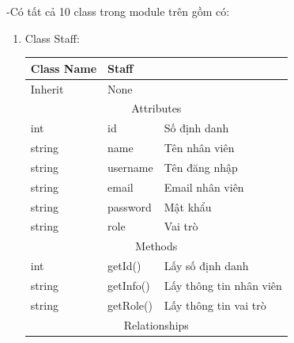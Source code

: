     \newpage
    -Có tất cả 10 class trong module trên gồm có:
    \begin{enumerate}
        \item Class Staff:

        \begin{table}[htp]
            \begin{tabular}{|lll|}
                \hline
                \multicolumn{1}{|l|}{Class Name} & \multicolumn{2}{l|}{Staff}                               \\ \hline
                \multicolumn{1}{|l|}{Inherit}    & \multicolumn{2}{l|}{None}                                \\ \hline
                \multicolumn{3}{|c|}{\cellcolor[HTML]{FFFFC7}Attributes}                                    \\ \hline
                \multicolumn{1}{|l|}{int}        & \multicolumn{1}{l|}{id}        & Số định danh            \\ \hline
                \multicolumn{1}{|l|}{string}     & \multicolumn{1}{l|}{name}      & Tên nhân viên           \\ \hline
                \multicolumn{1}{|l|}{string}     & \multicolumn{1}{l|}{username}  & Tên đăng nhập           \\ \hline
                \multicolumn{1}{|l|}{string}     & \multicolumn{1}{l|}{email}     & Email nhân viên         \\ \hline
                \multicolumn{1}{|l|}{string}     & \multicolumn{1}{l|}{password}  & Mật khẩu                \\ \hline
                \multicolumn{1}{|l|}{string}     & \multicolumn{1}{l|}{role}      & Vai trò                 \\ \hline
                \multicolumn{3}{|c|}{\cellcolor[HTML]{FFFFC7}Methods}                                       \\ \hline
                \multicolumn{1}{|l|}{int}        & \multicolumn{1}{l|}{getId()}   & Lấy số định danh        \\ \hline
                \multicolumn{1}{|l|}{string}     & \multicolumn{1}{l|}{getInfo()} & Lấy thông tin nhân viên \\ \hline
                \multicolumn{1}{|l|}{string}     & \multicolumn{1}{l|}{getRole()} & Lấy thông tin vai trò   \\ \hline
                \multicolumn{3}{|c|}{\cellcolor[HTML]{FFFFC7}Relationships}                                 \\ \hline
            \end{tabular}
        \end{table}
               

\end{enumerate}
